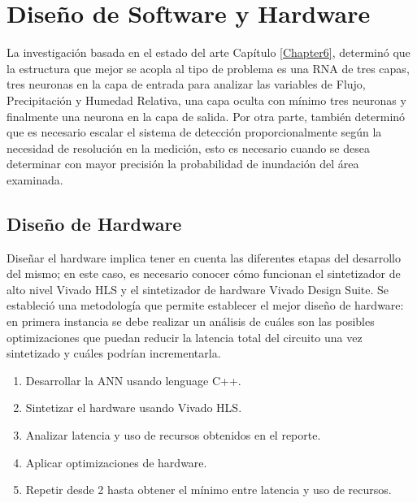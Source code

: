 
\chapter{Diseño de Software y Hardware} %
\label{Chapter10}

La investigación basada en el estado del arte Capítulo \ref{Chapter6}, determinó que la estructura que mejor se acopla al tipo de problema es una RNA de tres capas, tres neuronas en la capa de entrada para analizar las variables de Flujo, Precipitación y Humedad Relativa, una capa oculta con mínimo tres neuronas y finalmente una neurona en la capa de salida. Por otra parte, también determinó que es necesario escalar el sistema de detección proporcionalmente según la necesidad de resolución en la medición, esto es necesario cuando se desea determinar con mayor precisión la probabilidad de inundación del área examinada.



\section{Diseño de Hardware}

Diseñar el hardware implica tener en cuenta las diferentes etapas del desarrollo del mismo; en este caso, es necesario conocer cómo funcionan el sintetizador de alto nivel Vivado HLS y el sintetizador de hardware Vivado Design Suite. Se estableció una metodología que permite establecer el mejor diseño de hardware: en primera instancia se debe realizar un análisis de cuáles son las posibles optimizaciones que puedan reducir la latencia total del circuito una vez sintetizado y cuáles podrían incrementarla.

\begin{enumerate}
\item Desarrollar la ANN usando lenguage C++.
\item Sintetizar el hardware usando Vivado HLS.
\item Analizar latencia y uso de recursos obtenidos en el reporte.
\item Aplicar optimizaciones de hardware.
\item Repetir desde 2 hasta obtener el mínimo entre latencia y uso de recursos.
\end{enumerate}

